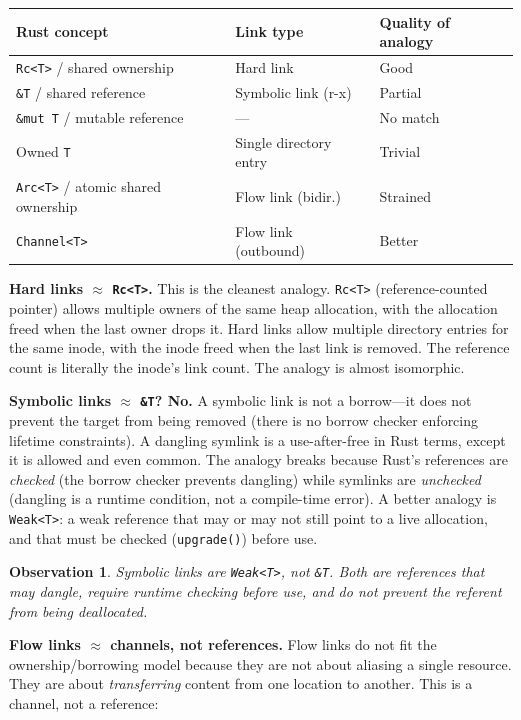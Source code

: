 \documentclass[11pt]{article}
\newtheorem{observation}{Observation}
\begin{document}
\begin{center}
\begin{tabular}{lll}
\toprule
\textbf{Rust concept} & \textbf{Link type} & \textbf{Quality of analogy} \\
\midrule
\texttt{Rc<T>} / shared ownership & Hard link & Good \\
\texttt{\&T} / shared reference & Symbolic link (r-x) & Partial \\
\texttt{\&mut T} / mutable reference & --- & No match \\
Owned \texttt{T} & Single directory entry & Trivial \\
\texttt{Arc<T>} / atomic shared ownership & Flow link (bidir.) & Strained \\
\texttt{Channel<T>} & Flow link (outbound) & Better \\
\bottomrule
\end{tabular}
\end{center}

\textbf{Hard links $\approx$ \texttt{Rc<T>}.} This is the cleanest analogy.
\texttt{Rc<T>} (reference-counted pointer) allows multiple owners of the same
heap allocation, with the allocation freed when the last owner drops it. Hard
links allow multiple directory entries for the same inode, with the inode freed
when the last link is removed. The reference count is literally the inode's
link count. The analogy is almost isomorphic.

\textbf{Symbolic links $\approx$ \texttt{\&T}? No.} A symbolic link is not
a borrow---it does not prevent the target from being removed (there is no
borrow checker enforcing lifetime constraints). A dangling symlink is a
use-after-free in Rust terms, except it is allowed and even common. The analogy
breaks because Rust's references are \emph{checked} (the borrow checker
prevents dangling) while symlinks are \emph{unchecked} (dangling is a runtime
condition, not a compile-time error). A better analogy is \texttt{Weak<T>}: a
weak reference that may or may not still point to a live allocation, and that
must be checked (\texttt{upgrade()}) before use.

\begin{observation}
Symbolic links are \texttt{Weak<T>}, not \texttt{\&T}. Both are references
that may dangle, require runtime checking before use, and do not prevent the
referent from being deallocated.
\end{observation}

\textbf{Flow links $\approx$ channels, not references.} Flow links do not fit
the ownership/borrowing model because they are not about aliasing a single
resource. They are about \emph{transferring} content from one location to
another. This is a channel, not a reference:
\end{document}
